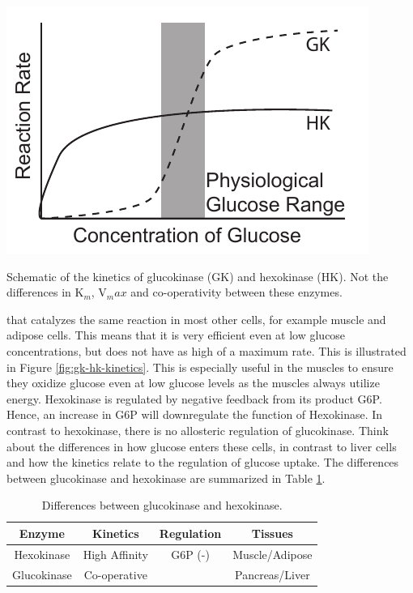 \documentclass{tufte-handout}
\begin{document}
\begin{marginfigure}
\includegraphics{figures/gk-hk-kinetics.pdf}
\caption{Schematic of the kinetics of glucokinase (GK) and hexokinase (HK).  Not the differences in K$_m$, V$_max$ and co-operativity between these enzymes.}
\label{fig:gk-hk-kinetics}
\end{marginfigure}

 that catalyzes the same reaction in most other cells, for example muscle and adipose cells.  This means that it is very efficient even at low glucose concentrations, but does not have as high of a maximum rate.  This is illustrated in Figure \ref{fig:gk-hk-kinetics}. This is especially useful in the muscles to ensure they oxidize glucose even at low glucose levels as the muscles always utilize energy. Hexokinase is regulated by negative feedback from its product G6P. Hence, an increase in G6P will downregulate the function of Hexokinase.  In contrast to hexokinase, there is no allosteric regulation of glucokinase.  Think about the differences in how glucose enters these cells, in contrast to liver cells and how the kinetics relate to the regulation of glucose uptake.  The differences between glucokinase and hexokinase are summarized in Table \ref{tab:glucokinase}.

\begin{table}
\centering
\caption{Differences between glucokinase and hexokinase.}
\label{tab:glucokinase}
\begin{tabular}{cccc}
\hline
\textbf {Enzyme} & \textbf{Kinetics}  & \textbf{Regulation}  & \textbf{Tissues}\\
\hline
Hexokinase & High Affinity & G6P (-) & Muscle/Adipose\\
Glucokinase & Co-operative & & Pancreas/Liver\\

\hline
\end{tabular}
\end{table}
\end{document}
